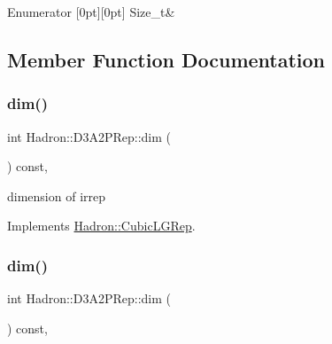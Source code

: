 \begin{DoxyEnumFields}{Enumerator}
[0pt][0pt]{}\mbox{\label{structHadron_1_1D3A2PRep_af7e065638e7dda1850c65fda8223940fa8bb13fdc1f05d38c1ee8f3ebe3a76b23}} 
Size\+\_\+t&\\
\hline

\end{DoxyEnumFields}


\subsection{Member Function Documentation}
\mbox{\label{structHadron_1_1D3A2PRep_a0cd24db04dc4889f2a1014f97efb41fc}} 
\subsubsection{\texorpdfstring{dim()}{dim()}\hspace{0.1cm}{\footnotesize\ttfamily [1/3]}}
{\footnotesize\ttfamily int Hadron\+::\+D3\+A2\+P\+Rep\+::dim (\begin{DoxyParamCaption}{ }\end{DoxyParamCaption}) const\hspace{0.3cm}{\ttfamily [inline]}, {\ttfamily [virtual]}}

dimension of irrep 

Implements \mbox{\hyperlink{structHadron_1_1CubicLGRep_a3acbaea26503ed64f20df693a48e4cdd}{Hadron\+::\+Cubic\+L\+G\+Rep}}.

\mbox{\label{structHadron_1_1D3A2PRep_a0cd24db04dc4889f2a1014f97efb41fc}} 
\subsubsection{\texorpdfstring{dim()}{dim()}\hspace{0.1cm}{\footnotesize\ttfamily [2/3]}}
{\footnotesize\ttfamily int Hadron\+::\+D3\+A2\+P\+Rep\+::dim (\begin{DoxyParamCaption}{ }\end{DoxyParamCaption}) const\hspace{0.3cm}{\ttfamily [inline]}, {\ttfamily [virtual]}}

